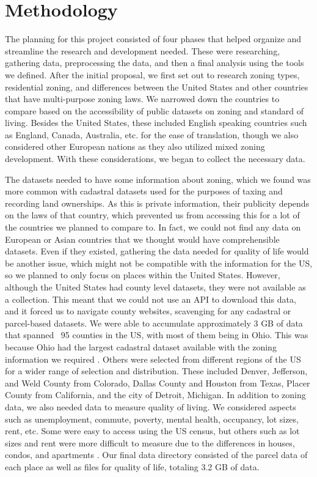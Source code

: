 \documentclass[titlepage]{article}
\begin{document}
\section{Methodology}
The planning for this project consisted of four phases that helped organize and streamline the research and development needed. These were researching, gathering data, preprocessing the data, and then a final analysis using the tools we defined. After the initial proposal, we first set out to research zoning types, residential zoning, and differences between the United States and other countries that have multi-purpose zoning laws. We narrowed down the countries to compare based on the accessibility of public datasets on zoning and standard of living. Besides the United States, these included English speaking countries such as England, Canada, Australia, etc. for the ease of translation, though we also considered other European nations as they also utilized mixed zoning development. With these considerations, we began to collect the necessary data.

The datasets needed to have some information about zoning, which we found was more common with cadastral datasets used for the purposes of taxing and recording land ownerships. As this is private information, their publicity depends on the laws of that country, which prevented us from accessing this for a lot of the countries we planned to compare to. In fact, we could not find any data on European or Asian countries that we thought would have comprehensible datasets. Even if they existed, gathering the data needed for quality of life would be another issue, which might not be compatible with the information for the US, so we planned to only focus on places within the United States. However, although the United States had county level datasets, they were not available as a collection. This meant that we could not use an API to download this data, and it forced us to navigate county websites, scavenging for any cadastral or parcel-based datasets. We were able to accumulate approximately 3 GB of data that spanned ~95 counties in the US, with most of them being in Ohio. This was because Ohio had the largest cadastral dataset available with the zoning information we required \cite{koordinates}. Others were selected from different regions of the US for a wider range of selection and distribution. These included Denver, Jefferson, and Weld County from Colorado, Dallas County and Houston from Texas, Placer County from California, and the city of Detroit, Michigan. In addition to zoning data, we also needed data to measure quality of living. We considered aspects such as unemployment, commute, poverty, mental health, occupancy, lot sizes, rent, etc. Some were easy to access using the US census, but others such as lot sizes and rent were more difficult to measure due to the differences in houses, condos, and apartments \cite{uscensus}. Our final data directory consisted of the parcel data of each place as well as files for quality of life, totaling 3.2 GB of data.
\end{document}
